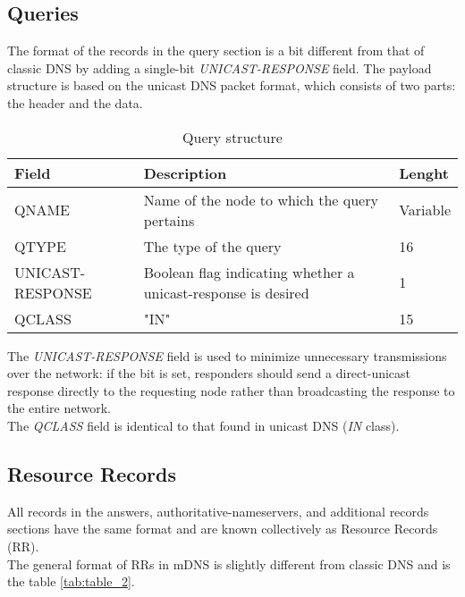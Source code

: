 \documentclass[fleqn, 10pt]{SelfArx} %
\begin{document}
\subsection{Queries}
The format of the records in the query section is a bit different from that of classic DNS by adding a single-bit {\it{UNICAST-RESPONSE}} field.
The payload structure is based on the unicast DNS packet format, which consists of two parts: the header and the data.

\begin{table}[hbt]
	\centering
	\begin{tabular}{|C{2cm}|C{2.8cm}|C{1.5cm}|}
		\hline
		Field & Description & Lenght \\
		\hline
		\hline
		QNAME & Name of the node to which the query pertains & Variable \\
		\hline
		QTYPE &	The type of the query &	16 \\
		\hline
		UNICAST-RESPONSE & Boolean flag indicating whether a unicast-response is desired & 1\\
		\hline
		QCLASS & "IN" & 15 \\
		\hline
	\end{tabular}
	\caption{Query structure}
\end{table}

The {\it{UNICAST-RESPONSE}} field is used to minimize unnecessary transmissions over the network: if the bit is set, responders should send a direct-unicast 
response directly to the requesting node rather than broadcasting the response to the entire network.\\
The {\it{QCLASS}} field is identical to that found in unicast DNS ({\it{IN}} class).

\subsection{Resource Records}
All records in the answers, authoritative-nameservers, and additional records sections have the same format and are known collectively as Resource Records (RR).\\
The general format of RRs in mDNS is slightly different from classic DNS and is the table \ref{tab:table_2}.
\end{document}

